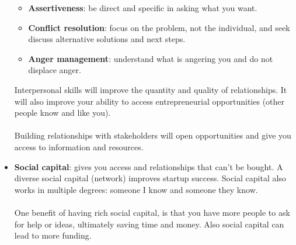 \documentclass{article}
\begin{document}
\begin{itemize}
\begin{itemize}
        \item \textbf{Assertiveness}: be direct and specific in asking what you want.
        \item \textbf{Conflict resolution}: focus on the problem, not the individual, and seek discuss alternative solutions and next steps.
        \item \textbf{Anger management}: understand what is angering you and do not displace anger.
      \end{itemize}
      Interpersonal skills will improve the quantity and quality of relationships. It will also improve your ability to access entrepreneurial opportunities (other people know and like you). \\ \\
      Building relationships with stakeholders will open opportunities and give you access to information and resources.
    \item \textbf{Social capital}: gives you access and relationships that can't be bought. A diverse social capital (network) improves startup success. Social capital also works in multiple degrees: someone I know and someone they know. \\ \\
      One benefit of having rich social capital, is that you have more people to ask for help or ideas, ultimately saving time and money. Also social capital can lead to more funding.
  \end{itemize}
\end{document}
